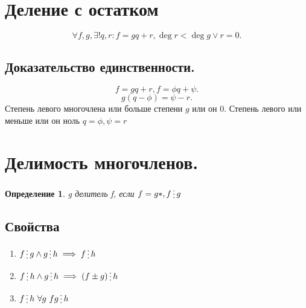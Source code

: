 \documentclass{scrartcl}
\newtheorem{definition}{Определение}
\newcommand{\divisible}{\mathop{\raisebox{-2pt}{\vdots}}}
\begin{document}
    \section{Деление с остатком}
    \[
        \forall  f, g , \exists ! q,r : f = gq + r , \deg{r} < \deg{g} \lor r = 0
    .\] 
    \subsection{Доказательство единственности.}
    \[
    f = gq + r, f = \phi q + \psi 
    .\] 
    \[
    g (q - \phi) = \psi   - r
    .\] 
    Степень левого многочлена или больше степени $g$ или он 0. Степень левого или меньше или он ноль $q =  \phi, \psi = r$
    \section{Делимость многочленов.}
    \begin{definition}
        g делитель f, если  $f = g * , f \divisible g$
    \end{definition}
    \subsection{Свойства}
    \begin{enumerate}
        \item $f \divisible g \land  g \divisible h \implies f \divisible h$
        \item $f \divisible h \land g \divisible h \implies (f \pm g) \divisible h$
        \item  $f \divisible h  ~ \forall{g} ~ fg \divisible h$
    \end{enumerate}
\end{document}
